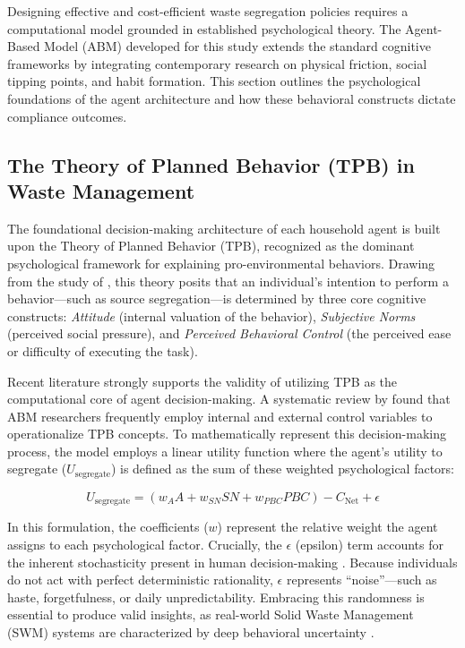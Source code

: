 
Designing effective and cost-efficient waste segregation policies requires a computational model grounded in established psychological theory. The Agent-Based Model (ABM) developed for this study extends the standard cognitive frameworks by integrating contemporary research on physical friction, social tipping points, and habit formation. This section outlines the psychological foundations of the agent architecture and how these behavioral constructs dictate compliance outcomes.

\subsection{The Theory of Planned Behavior (TPB) in Waste Management}

The foundational decision-making architecture of each household agent is built upon the Theory of Planned Behavior (TPB), recognized as the dominant psychological framework for explaining pro-environmental behaviors. Drawing from the study of \citet{Ceschi2021}, this theory posits that an individual's intention to perform a behavior—such as source segregation—is determined by three core cognitive constructs: \textit{Attitude} (internal valuation of the behavior), \textit{Subjective Norms} (perceived social pressure), and \textit{Perceived Behavioral Control} (the perceived ease or difficulty of executing the task).

Recent literature strongly supports the validity of utilizing TPB as the computational core of agent decision-making. A systematic review by \citet{Taraghi2025} found that ABM researchers frequently employ internal and external control variables to operationalize TPB concepts. To mathematically represent this decision-making process, the model employs a linear utility function where the agent's utility to segregate ($U_{\mathrm{segregate}}$) is defined as the sum of these weighted psychological factors:

\begin{equation}
    U_{\mathrm{segregate}} = (w_A A + w_{SN} SN + w_{PBC} PBC) - C_{\mathrm{Net}} + \epsilon
    \label{eq:behavior_equation}
\end{equation}

In this formulation, the coefficients ($w$) represent the relative weight the agent assigns to each psychological factor. Crucially, the $\epsilon$ (epsilon) term accounts for the inherent stochasticity present in human decision-making \citep{Chen2023, Zheng2022}. Because individuals do not act with perfect deterministic rationality, $\epsilon$ represents ``noise''—such as haste, forgetfulness, or daily unpredictability. Embracing this randomness is essential to produce valid insights, as real-world Solid Waste Management (SWM) systems are characterized by deep behavioral uncertainty \citep{Meng2018}.

